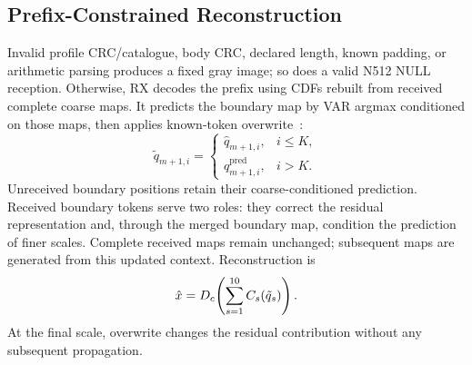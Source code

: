 \subsection{Prefix-Constrained Reconstruction}
Invalid profile CRC/catalogue, body CRC, declared length, known padding, or arithmetic parsing produces a fixed gray image; so does a valid N512 NULL reception. Otherwise, RX decodes the prefix using CDFs rebuilt from received complete coarse maps. It predicts the boundary map by VAR argmax conditioned on those maps, then applies known-token overwrite~\cite{var}:
\begin{equation}
 \tilde q_{m+1,i}=\begin{cases}\hat q_{m+1,i},&i\leq K,\\q^{\mathrm{pred}}_{m+1,i},&i>K.\end{cases}
 \label{eq:overwrite}
\end{equation}
Unreceived boundary positions retain their coarse-conditioned prediction. Received boundary tokens serve two roles: they correct the residual representation and, through the merged boundary map, condition the prediction of finer scales. Complete received maps remain unchanged; subsequent maps are generated from this updated context. Reconstruction is
\begin{equation}
 \hat x=D_c\!\left(\sum_{s=1}^{10}C_s(\tilde q_s)\right).
 \label{eq:reconstruction}
\end{equation}
At the final scale, overwrite changes the residual contribution without any subsequent propagation.
